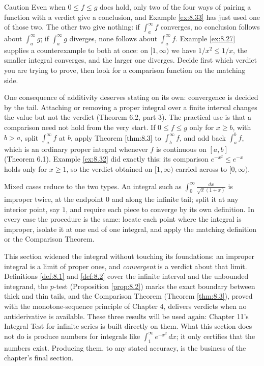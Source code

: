 \documentclass[a4paper,12pt,oneside]{memoir}
\begin{document}
\begin{envcaution}{Caution}{}{}
Even when \(0 \le f \le g\) does hold, only two of the four ways of pairing a function with a verdict give a conclusion, and Example \ref{ex:8.33} has just used one of those two. The other two give nothing: if \(\int_{a}^{\infty} f\) converges, no conclusion follows about \(\int_{a}^{\infty} g\); if \(\int_{a}^{\infty} g\) diverges, none follows about \(\int_{a}^{\infty} f\). Example \ref{ex:8.27} supplies a counterexample to both at once: on \([1, \infty)\) we have \(1/x^{2} \le 1/x\), the smaller integral converges, and the larger one diverges. Decide first which verdict you are trying to prove, then look for a comparison function on the matching side.
\end{envcaution}
One consequence of additivity deserves stating on its own: convergence is decided by the tail. Attaching or removing a proper integral over a finite interval changes the value but not the verdict (Theorem 6.2, part 3). The practical use is that a comparison need not hold from the very start. If \(0 \le f \le g\) only for \(x \ge b\), with \(b > a\), split \(\int_{a}^{\infty} f\) at \(b\), apply Theorem \ref{thm:8.3} to \(\int_{b}^{\infty} f\), and add back \(\int_{a}^{b} f\), which is an ordinary proper integral whenever \(f\) is continuous on \([a, b]\) (Theorem 6.1). Example \ref{ex:8.32} did exactly this: its comparison \(e^{-x^{2}} \le e^{-x}\) holds only for \(x \ge 1\), so the verdict obtained on \([1, \infty)\) carried across to \([0, \infty)\).

Mixed cases reduce to the two types. An integral such as \(\int_{0}^{\infty} \tfrac{dx}{\sqrt{x}(1 + x)}\) is improper twice, at the endpoint \(0\) and along the infinite tail; split it at any interior point, say \(1\), and require each piece to converge by its own definition. In every case the procedure is the same: locate each point where the integral is improper, isolate it at one end of one integral, and apply the matching definition or the Comparison Theorem.

This section widened the integral without touching its foundations: an improper integral is a limit of proper ones, and \emph{convergent} is a verdict about that limit. Definitions \ref{def:8.1} and \ref{def:8.2} cover the infinite interval and the unbounded integrand, the \(p\)-test (Proposition \ref{prop:8.2}) marks the exact boundary between thick and thin tails, and the Comparison Theorem (Theorem \ref{thm:8.3}), proved with the monotone-sequence principle of Chapter 4, delivers verdicts when no antiderivative is available. These three results will be used again: Chapter 11’s Integral Test for infinite series is built directly on them. What this section does not do is produce numbers for integrals like \(\int_{1}^{\infty} e^{-x^{2}}\,dx\); it only certifies that the numbers exist. Producing them, to any stated accuracy, is the business of the chapter’s final section.
\end{document}
